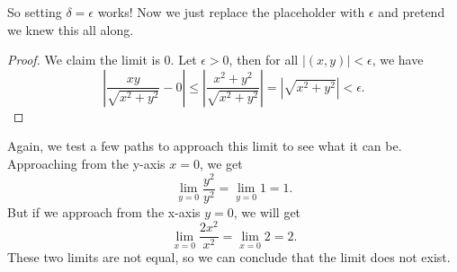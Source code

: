 So setting $\delta=\epsilon$ works! Now we just replace the placeholder with $\epsilon$ and pretend we knew this all along.
\begin{proof}
    We claim the limit is $0$. Let $\epsilon>0$, then for all $|(x,y)|<\epsilon$, we have  \[
        \left|\frac{xy}{\sqrt{x^2+y^2}}-0\right|\leq\left|\frac{x^2+y^2}{\sqrt{x^2+y^2}}\right|
        =\left|\sqrt{x^2+y^2}\right|<\epsilon.
    \]
\end{proof}
Again, we test a few paths to approach this limit to see what it can be.
Approaching from the y-axis $x=0$, we get \[
\lim_{y=0}\frac{y^2}{y^2}=\lim_{y=0}1 =1.
\]
But if we approach from the x-axis $y=0$, we will get\[
    \lim_{x=0}\frac{2x^2}{x^2}=\lim_{x=0}2 =2.
\]
These two limits are not equal, so we can conclude that the limit does not exist.



